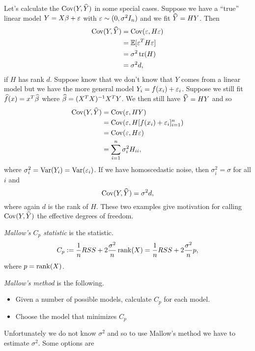\begin{ex}
    Let's calculate the $\operatorname*{Cov}(Y,\widehat{Y})$ in some special cases. Suppose we have a ``true'' linear model $Y=X\beta + \varepsilon$ with $\varepsilon \sim (0,\sigma^2I_n)$ and we fit $\widehat{Y} = HY$. Then
    \begin{align*}
        \operatorname*{Cov}(Y,\widehat{Y}) &= \operatorname*{Cov}(\varepsilon, H\varepsilon)\\
        &={\mathbb{E}}[\varepsilon^TH\varepsilon]\\
        &=\sigma^2\operatorname*{tr}(H)\\
        &=\sigma^2d,
    \end{align*}
    if $H$ has rank $d$. Suppose know that we don't know that $Y$ comes from a linear model but we have the more general model $Y_i = f(x_i)+\varepsilon_i$. Suppose we still fit $\widehat{f}(x) = x^T\widehat{\beta}$ where $\widehat{\beta} = (X^TX)^{-1}X^TY$. We then still have $\widehat{Y} =HY$ and so
    \begin{align*}
        \operatorname*{Cov}(Y,\widehat{Y}) &= \operatorname*{Cov}(\varepsilon, HY)\\
        &=\operatorname*{Cov}(\varepsilon, H[f(x_i)+\varepsilon_i]_{i=1}^n)\\
        &=\operatorname*{Cov}(\varepsilon, H\varepsilon)\\
        &= \sum_{i=1}^n \sigma_i^2 H_{ii},
    \end{align*} 
    where $\sigma_i^2 = \operatorname{Var}(Y_i) = \operatorname{Var}(\varepsilon_i)$. If we have homoscedastic noise, then $\sigma_i^2 =\sigma$ for all $i$ and 
    \[\operatorname*{Cov}(Y,\widehat{Y}) = \sigma^2d, \]
    where again $d$ is the rank of $H$. These two examples give motivation for calling $\operatorname*{Cov}(Y,\widehat{Y})$ the effective degrees of freedom.
\end{ex}
\begin{defn}
    \emph{Mallow's $C_p$ statistic} is the statistic.
    \[C_p := \frac{1}{n}RSS + 2\frac{\sigma^2}{n}\operatorname*{rank}(X)=\frac{1}{n}RSS+2\frac{\sigma^2}{n}p, \]
    where $p=\operatorname*{rank}(X)$. 
\end{defn}
\begin{defn}
    \emph{Mallow's method} is the following.
    \begin{itemize}
        \item Given a number of possible models, calculate $C_p$ for each model.
        \item Choose the model that minimizes $C_p$
    \end{itemize} 
\end{defn}
Unfortunately we do not know $\sigma^2$ and so to use Mallow's method we have to estimate $\sigma^2$. Some options are
